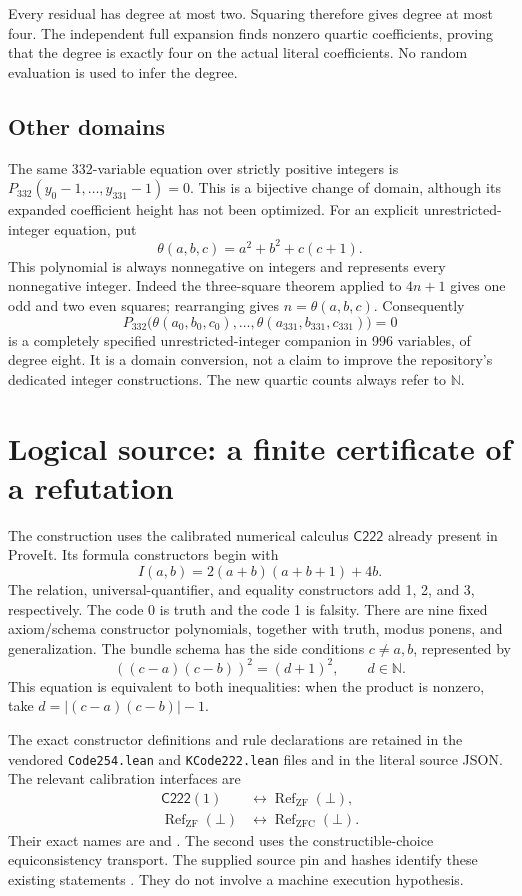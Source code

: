 \documentclass[11pt,letterpaper]{article}
\theoremstyle{remark}\newtheorem{remark}[theorem]{Remark}
\newcommand{\N}{\mathbb N}\newcommand{\Z}{\mathbb Z}
\newcommand{\Refute}{\operatorname{Ref}}\newcommand{\Ctwo}{\mathsf{C222}}
\newcommand{\Psmall}{P_{332}}\newcommand{\Psparse}{P_{333}}
\begin{document}
Every residual has degree at most two. Squaring therefore gives degree
at most four. The independent full expansion finds nonzero quartic
coefficients, proving that the degree is exactly four on the actual
literal coefficients. No random evaluation is used to infer the degree.

\subsection{Other domains}

The same 332-variable equation over strictly positive integers is
\(\Psmall(y_0-1,\ldots,y_{331}-1)=0\). This is a bijective change of
domain, although its expanded coefficient height has not been optimized.
For an explicit unrestricted-integer equation, put
\[
 \theta(a,b,c)=a^2+b^2+c(c+1).
\]
This polynomial is always nonnegative on integers and represents every
nonnegative integer. Indeed the three-square theorem applied to
\(4n+1\) gives one odd and two even squares; rearranging gives
\(n=\theta(a,b,c)\). Consequently
\[
 \Psmall\bigl(\theta(a_0,b_0,c_0),\ldots,
                    \theta(a_{331},b_{331},c_{331})\bigr)=0
\]
is a completely specified unrestricted-integer companion in 996 variables,
of degree eight. It is a domain conversion, not a claim to improve the
repository's dedicated integer constructions. The new quartic counts
always refer to \(\N\).

\section{Logical source: a finite certificate of a refutation}

The construction uses the calibrated numerical calculus \(\Ctwo\)
already present in ProveIt. Its formula constructors begin with
\[
 I(a,b)=2(a+b)(a+b+1)+4b.
\]
The relation, universal-quantifier, and equality constructors add 1, 2,
and 3, respectively. The code 0 is truth and the code 1 is falsity.
There are nine fixed axiom/schema constructor polynomials, together with
truth, modus ponens, and generalization. The bundle schema has the side
conditions \(c\ne a,b\), represented by
\[
 ((c-a)(c-b))^2=(d+1)^2,\qquad d\in\N.
\]
This equation is equivalent to both inequalities: when the product is
nonzero, take \(d=|(c-a)(c-b)|-1\).

The exact constructor definitions and rule declarations are retained in
the vendored \texttt{Code254.lean} and \texttt{KCode222.lean} files and
in the literal source JSON. The relevant calibration interfaces are
\begin{align*}
 \Ctwo(1)&\longleftrightarrow
       \Refute_{\mathrm{ZF}}(\bot),\\
 \Refute_{\mathrm{ZF}}(\bot)&\longleftrightarrow
       \Refute_{\mathrm{ZFC}}(\bot).
\end{align*}
Their exact names are 
and .
The second uses the constructible-choice equiconsistency transport.
The supplied source pin and hashes identify these existing statements
\cite{calibration}. They do not involve a machine execution hypothesis.
\end{document}
